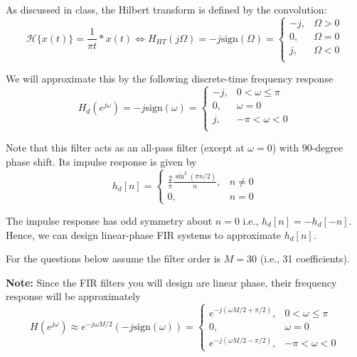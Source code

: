 \documentclass[12pt]{report}
\begin{document}
As discussed in class, the Hilbert transform is defined by the convolution:
\begin{equation}
	\mathcal{H}\{x(t)\} = \frac{1}{\pi t}\ast x(t) \Longleftrightarrow 	H_{HT}(j\Omega) = -j\mathrm{sign}(\Omega) = \begin{cases}
	-j, & \Omega > 0 \\
	0, & \Omega = 0  \\
	j, & \Omega < 0 \\
	\end{cases}
\end{equation}

We will approximate this by the following discrete-time frequency response
\begin{equation}
	H_{d}(e^{j\omega}) = -j\mathrm{sign}(\omega) = \begin{cases}
	-j, & 0 < \omega \leq \pi \\
	0, & \omega = 0  \\
	j, & -\pi < \omega < 0 \\
	\end{cases}
\end{equation}

Note that this filter acts as an all-pass filter (except at $\omega = 0$) with  90-degree phase shift. Its impulse response is given by
\begin{equation} \label{eq:hilbert-impulse}
	h_d[n] = \begin{cases}
	\displaystyle\frac{2}{\pi}\frac{\sin^2(\pi n/2)}{n}, &n \neq 0 \\
	0, & n = 0
	\end{cases}
\end{equation}

The impulse response has odd symmetry about $n = 0$ i.e., $h_d[n] = -h_d[-n]$. Hence, we can design linear-phase FIR systems to approximate $h_d[n]$.

For the questions below assume the filter order is $M = 30$ (i.e., 31 coefficients).

\noindent\textbf{Note:} Since the FIR filters you will design are linear phase, their frequency response will be approximately
\begin{equation}
	H(e^{j\omega}) \approx e^{-j\omega M/2}(-j\mathrm{sign}(\omega)) = \begin{cases}
	e^{-j(\omega M/2 + \pi/2)}, & 0 < \omega \leq \pi \\
	0, &\omega = 0 \\
	e^{-j(\omega M/2 - \pi/2)}, & -\pi < \omega < 0
	\end{cases} 
\end{equation}
\end{document}
